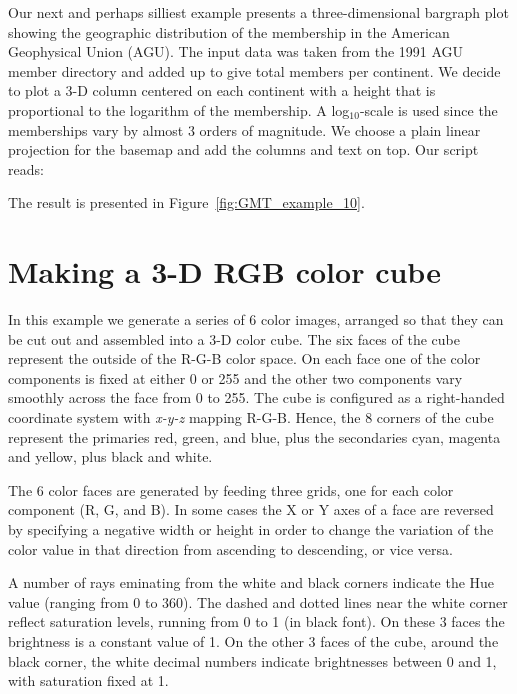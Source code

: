 Our next and perhaps silliest example presents a
three-dimensional bargraph plot showing the geographic
distribution of the membership in the American Geophysical
Union (AGU).  The input data was taken from the 1991 AGU
member directory and added up to give total members per
continent.  We decide to plot a 3-D column centered on
each continent with a height that is proportional to the
logarithm of the membership.  A log$_{10}$-scale is
used since the memberships vary by almost 3 orders of
magnitude.  We choose a plain linear projection for the
basemap and add the columns and text on top. Our script reads:


The result is presented in Figure~\ref{fig:GMT_example_10}.



\section{Making a 3-D RGB color cube}

In this example we generate a series of 6 color images,
arranged so that they can be cut out
and assembled into a 3-D color cube.  The six faces of
the cube represent the outside of the R-G-B color space.
On each face one of the color components is fixed at either
0 or 255 and the other two components vary smoothly across
the face from 0 to 255.  The cube is configured as a
right-handed coordinate system with \emph{x-y-z} mapping
R-G-B.  Hence, the 8 corners of the cube represent the
primaries red, green, and blue, plus the secondaries cyan,
magenta and yellow, plus black and white.

The 6 color faces are generated by feeding  three grids, one for each color
component (R, G, and B). In some cases the X or Y axes of a face are reversed by specifying a
negative width or height in order to change the variation of the color value in that direction from
ascending to descending, or vice versa.

A number of rays eminating from the white and black corners indicate the Hue value (ranging from 0 to
360\DS). The dashed and dotted lines near the white corner reflect saturation levels, running from 0
to 1 (in black font). On these 3 faces the brightness is a constant value of 1.
On the other 3 faces of the cube, around the black corner, the white decimal numbers indicate
brightnesses between 0 and 1, with saturation fixed at 1.

